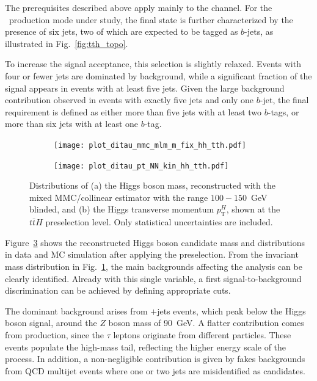 The prerequisites described above apply mainly to the \tauhadhad channel. 
For the \ttH\ production mode under study, the final state is further characterized by the presence of six jets, two of which are expected to be tagged as $b$-jets, as illustrated in Fig.~\ref{fig:tth_topo}. 

To increase the signal acceptance, this selection is slightly relaxed. Events with four or fewer jets are dominated by background, while a significant fraction of the signal appears in events with at least five jets. 
Given the large background contribution observed in events with exactly five jets and only one $b$-jet, the final requirement is defined as either more than five jets with at least two $b$-tags, or more than six jets with at least one $b$-tag.

\begin{figure}[htbp]
    \centering
    \begin{subfigure}[b]{0.48\textwidth}
        \centering
        \texttt{[image: plot\_ditau\_mmc\_mlm\_m\_fix\_hh\_tth.pdf]}
        \caption{}
        \label{reconstructed_preselection_a}
    \end{subfigure}
    \hfill
    \begin{subfigure}[b]{0.48\textwidth}
        \centering
        \texttt{[image: plot\_ditau\_pt\_NN\_kin\_hh\_tth.pdf]}
        \caption{}
        \label{reconstructed_preselection_b}
    \end{subfigure}
    \caption{Distributions of (a) the Higgs boson mass, reconstructed with the mixed MMC/collinear estimator with the range $100-150$~GeV blinded, and (b) the Higgs transverse momentum $p_{\text{T}}^H$, shown at the $t\bar{t}H$ preselection level. Only statistical uncertainties are included.}
    \label{reconstructed_preselection}
\end{figure}


Figure~\ref{reconstructed_preselection} shows the reconstructed Higgs boson candidate mass and \pth distributions in data and MC simulation after applying the preselection. 
From the invariant mass distribution in Fig.~\ref{reconstructed_preselection_a}, the main backgrounds affecting the analysis can be clearly identified. 
Already with this single variable, a first signal-to-background discrimination can be achieved by defining appropriate cuts. 

The dominant background arises from \ztautau$+$jets events, which peak below the Higgs boson signal, around the $Z$ boson mass of 90~GeV. 
A flatter contribution comes from \ttbar production, since the $\tau$ leptons originate from different particles. 
These events populate the high-mass tail, reflecting the higher energy scale of the process. In addition, a non-negligible contribution is given by fakes backgrounds from QCD multijet events where one or two jets are misidentified as \tauhad candidates. 

